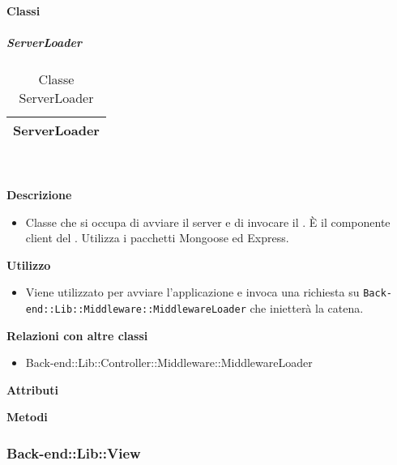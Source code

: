 		\paragraph{Classi}
			\subparagraph{ServerLoader} 
\begin{table}[ht]
\begin{center}
\bgroup
	\setlength{\arrayrulewidth}{0.6mm}
	\def\arraystretch{1}
		\begin{tabular}{ | p{12cm} | }
				\hline  
					\centerline{\textbf{ServerLoader}}
		\\ \hline 
				\hline
				\hline
		
		\end{tabular}
\egroup
\caption{Classe ServerLoader}
\end{center}
\end{table}  \textbf{\\ \\ Descrizione} 
					\begin{itemize}
						\item[] Classe che si occupa di avviare il server e di invocare il . È il componente client del  . Utilizza i pacchetti Mongoose ed Express.
					\end{itemize}      
				\textbf{Utilizzo}  
					\begin{itemize}
						\item[] Viene utilizzato per avviare l'applicazione e invoca una richiesta su \texttt{Back-end::Lib::Middleware::MiddlewareLoader} che inietterà la catena.
					\end{itemize}
					\textbf{Relazioni con altre classi}
					\begin{itemize}
							\item{Back-end::Lib::Controller::Middleware::MiddlewareLoader}
					\end{itemize}
			 \textbf{Attributi} 
	\begin{itemize}
		\end{itemize}
		
		\textbf{Metodi} 
	\begin{itemize}
		\end{itemize}
	\subsubsection{Back-end::Lib::View} 
